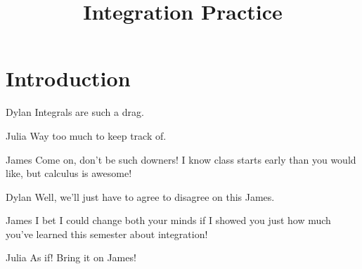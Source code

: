 \documentclass{ximera}
\title{Integration Practice}
\begin{document}
\section{Introduction}

\begin{dialogue}
\item[Dylan] Integrals are such a drag.
\item[Julia] Way too much to keep track of.
\item[James] Come on, don't be such downers! I know class starts early than you would like, but calculus is awesome!
\item[Dylan] Well, we'll just have to agree to disagree on this James.
\item[James] I bet I could change both your minds if I showed you just how much you've learned this semester about integration!
\item[Julia] As if! Bring it on James!
\end{dialogue}
\end{document}
